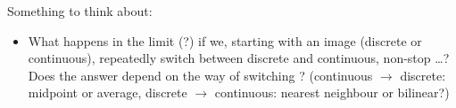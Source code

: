 \begin{bsp}
Something to think about:
	\vspace{-1em}
  \begin{itemize}[]
    \item%
			What happens in the limit (?) if we, starting
			with an image (discrete or continuous),
			repeatedly switch between discrete and continuous,
			non-stop \dots ? \\
			Does the answer depend on the way of switching ? 
			(continuous $\to$ discrete: midpoint or average, 
			discrete $\to$ continuous: nearest neighbour or bilinear?) 
  \end{itemize}

\end{bsp}


